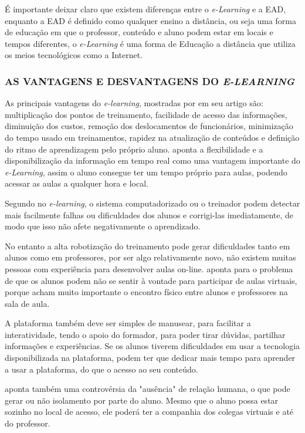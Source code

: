 \par
É importante deixar claro que existem diferenças entre o \textit{e-Learning} e a EAD, enquanto a EAD é definido como qualquer ensino a distância, ou seja uma forma de educação em que o professor, conteúdo e aluno podem estar em locais e tempos diferentes, o \textit{e-Learning} é uma forma de Educação a distância que utiliza os meios tecnológicos como a Internet.


\subsubsection{AS VANTAGENS E DESVANTAGENS DO \textit{E-LEARNING}}
As principais vantagens do \textit{e-learning}, mostradas por  em seu artigo são: multiplicação dos pontos de treinamento, facilidade de acesso das informações, diminuição dos custos, remoção dos deslocamentos de funcionários, minimização do tempo usado em treinamentos, rapidez na atualização de conteúdos e definição do ritmo de aprendizagem pelo próprio aluno.
 aponta a flexibilidade e a disponibilização da informação em tempo real como uma vantagem importante do \textit{e-Learning}, assim o aluno consegue ter um tempo próprio para aulas, podendo acessar as aulas a qualquer hora e local.
\par
Segundo \cite[p.~6]{bernardo} no \textit{e-learning}, o sistema computadorizado ou o treinador podem detectar mais facilmente falhas ou dificuldades dos alunos e corrigi-las imediatamente, de modo que isso não afete negativamente o aprendizado.
\par
No entanto a alta robotização do treinamento pode gerar dificuldades tanto em alunos como em professores, por ser algo relativamente novo, não existem muitas pessoas com experiência para desenvolver aulas on-line. \cite[p.~6]{bernardo} aponta para o problema de que os alunos podem não se sentir à vontade para participar de aulas virtuais, porque acham muito importante o encontro físico entre alunos e professores na sala de aula.
\par
A plataforma também deve ser simples de manusear, para facilitar a interatividade, tendo o apoio do formador, para poder tirar dúvidas, partilhar informações e experiências. Se os alunos tiverem dificuldades em usar a tecnologia disponibilizada na plataforma, podem ter que dedicar mais tempo para aprender a usar a plataforma, do que o acesso ao seu conteúdo. 
\par
{} aponta também uma controvérsia da "ausência" de relação humana, o que pode gerar ou não isolamento por parte do aluno. Mesmo que o aluno possa estar sozinho no local de acesso, ele poderá ter a companhia dos colegas virtuais e até do professor.

